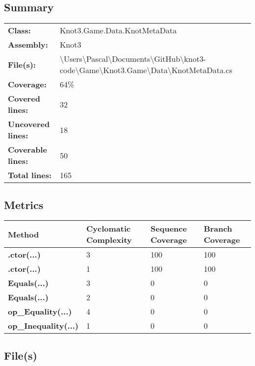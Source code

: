 \documentclass[a4paper,10pt]{article}
\begin{document}
\subsection{Summary}
\begin{longtable}[l]{ll}
\textbf{Class:} & Knot3.Game.Data.KnotMetaData\\
\textbf{Assembly:} & Knot3\\
\textbf{File(s):} & \begin{minipage}[t]{12cm}{\textbackslash Users\textbackslash Pascal\textbackslash Documents\textbackslash GitHub\textbackslash knot3-code\textbackslash Game\textbackslash Knot3.Game\textbackslash Data\textbackslash KnotMetaData.cs}\end{minipage} \\
\textbf{Coverage:} & 64\%\\
\textbf{Covered lines:} & 32\\
\textbf{Uncovered lines:} & 18\\
\textbf{Coverable lines:} & 50\\
\textbf{Total lines:} & 165\\
\end{longtable}
\subsection{Metrics}
\begin{longtable}[l]{|l|l|l|l|}
\hline
\textbf{Method} & \textbf{Cyclomatic Complexity} & \textbf{Sequence Coverage} & \textbf{Branch Coverage}\\
\hline
\textbf{.ctor(...)} & 3 & 100 & 100\\
\hline
\textbf{.ctor(...)} & 1 & 100 & 100\\
\hline
\textbf{Equals(...)} & 3 & 0 & 0\\
\hline
\textbf{Equals(...)} & 2 & 0 & 0\\
\hline
\textbf{op\_Equality(...)} & 4 & 0 & 0\\
\hline
\textbf{op\_Inequality(...)} & 1 & 0 & 0\\
\hline
\end{longtable}
\subsection{File(s)}
\end{document}
